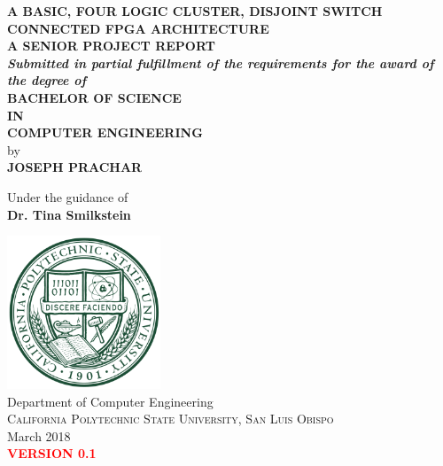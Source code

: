 \documentclass[12pt]{article}
\renewcommand{\baselinestretch}{1.5}
\begin{document}
\begin{titlepage}

\begin{center}

\renewcommand{\baselinestretch}{1.5}
\Large \textbf { A BASIC, FOUR LOGIC CLUSTER, DISJOINT SWITCH CONNECTED FPGA ARCHITECTURE }\\[0.8in]


\normalsize
\textbf{ A SENIOR PROJECT REPORT}\\[0.1in]
 \small
       \textit{\textbf{Submitted in partial fulfillment of
        the requirements for the award of the degree of}}\\[0.3in]
        
\normalsize
       \textbf{ BACHELOR OF SCIENCE \\IN\\ COMPUTER ENGINEERING}\\[0.5in]

 by \\
\textbf{ JOSEPH PRACHAR }




\vspace{.3in}
Under the guidance of\\
{\textbf{ Dr. Tina Smilkstein }}\\[0.1in]

\vfill

\includegraphics[height=1.8in]{logo}\\[0.1in]
{Department of Computer Engineering}\\
\normalsize
\textsc{ California Polytechnic State University, San Luis Obispo }\\
March 2018\\
\textcolor{red}{\textbf{VERSION 0.1}}


\end{center}

\end{titlepage}
\end{document}
